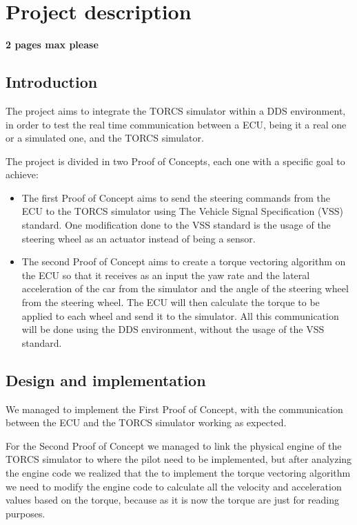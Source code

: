 \documentclass[10pt,a4]{article}
\begin{document}
\section{Project description}

\textbf{2 pages max please}


\subsection{Introduction}

\par The project aims to integrate the TORCS simulator within a DDS environment, in order to test the real time
communication between a ECU, being it a real one or a simulated one, and the TORCS simulator.
\par The project is divided in two Proof of Concepts, each one with a specific goal to achieve:
\begin{itemize}
  \item The first Proof of Concept aims to send the steering commands from the ECU to the TORCS simulator using The
        Vehicle Signal Specification (VSS) standard. One modification done to the VSS standard is the usage of the steering
        wheel as an actuator instead of being a sensor.
  \item The second Proof of Concept aims to create a torque vectoring algorithm on the ECU so that it receives as an input
        the yaw rate and the lateral acceleration of the car from the simulator and the angle of the steering wheel from the steering
        wheel. The ECU will then calculate the torque to be applied to each wheel and send it to the simulator.
        All this communication will be done using the DDS environment, without the usage of the VSS standard.
\end{itemize}

\subsection{Design and implementation}


\par We managed to implement the First Proof of Concept, with the communication between the ECU and the TORCS simulator working as expected.

\par For the Second Proof of Concept we managed to link the physical engine of the TORCS simulator to where the pilot need to be implemented,
but after analyzing the engine code we realized that the to implement the torque vectoring algorithm we need to modify the engine code
to calculate all the velocity and acceleration values based on the torque, because as it is now the torque are just for reading purposes.
\end{document}
